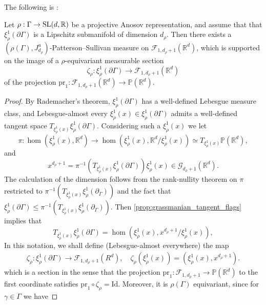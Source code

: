 \documentclass{report}
\begin{document}
The following is \cite[Proposition 6.4]{pozzetti_anosov_2023}:
\begin{proposition}\label{prop:PSMeasureExists}
    Let $\rho: \Gamma \to \operatorname{{\mathrm{SL}}}(d, \mathbb R)$ be a projective Anosov representation, and assume that that $\xi^1_\rho(\partial \Gamma)$ is a Lipschitz submanifold of dimension $d_\rho$.
    Then there exists a $(\rho(\Gamma), J_{d_\rho}^u)$-Patterson--Sullivan measure on $\mathcal F_{1,d_\rho + 1}(\mathbb R^d)$, which is supported on the image of a $\rho$-equivariant measurable section
    \[
    \zeta_\rho: \xi_\rho^1(\partial \Gamma) \to \mathcal F_{1, d_\rho + 1}(\mathbb R^d)
    \]
    of the projection $\mathrm{pr}_1: \mathcal F_{1, d_\rho + 1}(\mathbb R^d) \to \mathbb P(\mathbb R^d)$.
\end{proposition}
\begin{proof}
    By Rademacher's theorem, $\xi^1_\rho(\partial \Gamma)$ has a well-defined Lebesgue measure class, and Lebesgue-almost every $\xi^1_\rho(x) \in \xi^1_\rho(\partial \Gamma)$ admits a well-defined tangent space $T_{\xi^1_\rho(x)} \xi^1_\rho(\partial \Gamma)$.
    Considering such a $\xi^1_\rho(x)$ we let
    \[
        \pi : \hom(\xi^1_\rho(x), \mathbb R^d) \to \hom(\xi^1_\rho(x), \mathbb R^d/\xi^1_\rho(x)) \simeq T_{\xi^1_\rho(x)} \mathbb P(\mathbb R^d),
    \]
    and
    \[
        x^{d_\rho + 1} = \pi^{-1} (T_{\xi^1_\rho(x)} \xi^1_\rho(\partial \Gamma)) \xi^1_\rho(x) \in 
        \mathcal G_{d_\rho + 1} (\mathbb R^d).
    \]
    The calculation of the dimension follows from the rank-nullity theorem on 
    $\pi$ restricted to  $\pi^{-1}(T_{\xi_\rho^1(x)} \xi_\rho^1(\partial_\Gamma))$ 
    and the fact that  
    $\xi_\rho^1(\partial \Gamma) \leq \pi^{-1}(T_{\xi_\rho^1(x)} \xi_\rho^1(\partial_\Gamma)) $. 
    Then \cref{prop:grassmanian_tangent_flags} implies that
    \[
        T_{\xi^1_\rho(x)} \xi^1_\rho(\partial \Gamma) = 
        \hom(\xi^1_\rho(x), x^{d_\rho + 1} / \xi^1_\rho(x)),
    \]
    In this notation, we shall define (Lebesgue-almost everywhere) the map
    \begin{align*}
        \zeta_\rho: \xi_\rho^1(\partial \Gamma) \to \mathcal F_{1, d_\rho + 1} (R^d), \quad 
        \zeta_\rho(\xi_\rho^1(x)) = (\xi_\rho^1(x), x^{d_\rho + 1}).
    \end{align*}
    which is a section in the sense that the projection $\mathrm{pr}_1: \mathcal F_{1, d_\rho + 1} \to \mathbb P(\mathbb R^d)$ to the first coordinate satisfies $\mathrm{pr}_1 \circ \zeta_\rho = \mathrm{Id}$.
    Moreover, it is $\rho(\Gamma)$ equivariant, since for $\gamma \in \Gamma$ we have

\end{proof}
\end{document}
